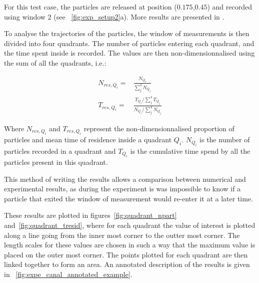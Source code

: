 For this test case, the particles are released at position ($0.175$,$0.45$) and recorded using window 2
(see \figurename~\ref{fig:exp_setup2}a). More results are presented in \citet{Joly_these}.

To analyse the trajectories of the particles, the window of measurements is then divided into four quadrants.
The number of particles entering each quadrant, and the time spent inside is recorded. The values are then
non-dimensionnalised using the sum of all the quadrants, i.e.:

\begin{subequations}
\begin{align}
N_{res,Q_i}=&\frac{N_{Q_i}}{\sum_j^4{N_{Q_j}}}
\\
T_{res,Q_i}=&\frac{T_{Q_i}/\sum_j^4{T_{Q_j}}}{N_{Q_i}/\sum_j^4{N_{Q_j}}}
\end{align}
\end{subequations}

Where $N_{res,Q_i}$ and $T_{res,Q_i}$ represent the non-dimensionnalised proportion of particles and mean time
of residence inside a quadrant $Q_i$. $N_{Q_i}$ is the number of particles recorded in a quadrant and $T_{Q_i}$
is the cumulative time spend by all the particles present in this quadrant.

This method of writing the results allows a comparison between numerical and experimental results, as during the
experiment is was impossible to know if a particle that exited the window of measurement would re-enter it at a later time.

These results are plotted in figures~\ref{fig:quadrant_npart} and~\ref{fig:quadrant_tresid}, where for each quadrant the value
of interest is plotted along a line going from the inner most corner to the outter most corner. The length scales for these
values are chosen in such a way that the maximum value is placed on the outer most corner. The points plotted for each quadrant
are then linked together to form an area. An annotated description of the results is given in \figurename~\ref{fig:expe_canal_annotated_example}.


